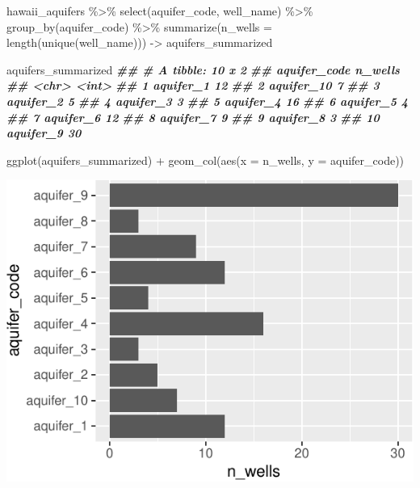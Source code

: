 \documentclass[
]{krantz}
\newenvironment{Shaded}{\begin{snugshade}}{\end{snugshade}}
\newcommand{\AttributeTok}[1]{\textcolor[rgb]{0.77,0.63,0.00}{#1}}
\newcommand{\DocumentationTok}[1]{\textcolor[rgb]{0.56,0.35,0.01}{\textbf{\textit{#1}}}}
\newcommand{\FunctionTok}[1]{\textcolor[rgb]{0.00,0.00,0.00}{#1}}
\newcommand{\NormalTok}[1]{#1}
\newcommand{\OtherTok}[1]{\textcolor[rgb]{0.56,0.35,0.01}{#1}}
\newcommand{\SpecialCharTok}[1]{\textcolor[rgb]{0.00,0.00,0.00}{#1}}
\begin{document}
\begin{Shaded}
\begin{Highlighting}[]
\NormalTok{hawaii\_aquifers }\SpecialCharTok{\%\textgreater{}\%}
  \FunctionTok{select}\NormalTok{(aquifer\_code, well\_name) }\SpecialCharTok{\%\textgreater{}\%}
  \FunctionTok{group\_by}\NormalTok{(aquifer\_code) }\SpecialCharTok{\%\textgreater{}\%}
  \FunctionTok{summarize}\NormalTok{(}\AttributeTok{n\_wells =} \FunctionTok{length}\NormalTok{(}\FunctionTok{unique}\NormalTok{(well\_name))) }\OtherTok{{-}\textgreater{}}\NormalTok{ aquifers\_summarized}

\NormalTok{aquifers\_summarized}
\DocumentationTok{\#\# \# A tibble: 10 x 2}
\DocumentationTok{\#\#    aquifer\_code n\_wells}
\DocumentationTok{\#\#    \textless{}chr\textgreater{}          \textless{}int\textgreater{}}
\DocumentationTok{\#\#  1 aquifer\_1         12}
\DocumentationTok{\#\#  2 aquifer\_10         7}
\DocumentationTok{\#\#  3 aquifer\_2          5}
\DocumentationTok{\#\#  4 aquifer\_3          3}
\DocumentationTok{\#\#  5 aquifer\_4         16}
\DocumentationTok{\#\#  6 aquifer\_5          4}
\DocumentationTok{\#\#  7 aquifer\_6         12}
\DocumentationTok{\#\#  8 aquifer\_7          9}
\DocumentationTok{\#\#  9 aquifer\_8          3}
\DocumentationTok{\#\# 10 aquifer\_9         30}

\FunctionTok{ggplot}\NormalTok{(aquifers\_summarized) }\SpecialCharTok{+} \FunctionTok{geom\_col}\NormalTok{(}\FunctionTok{aes}\NormalTok{(}\AttributeTok{x =}\NormalTok{ n\_wells, }\AttributeTok{y =}\NormalTok{ aquifer\_code))}
\end{Highlighting}
\end{Shaded}

\begin{center}\includegraphics[width=0.8\linewidth]{index_files/figure-latex/unnamed-chunk-134-1} \end{center}
\end{document}
